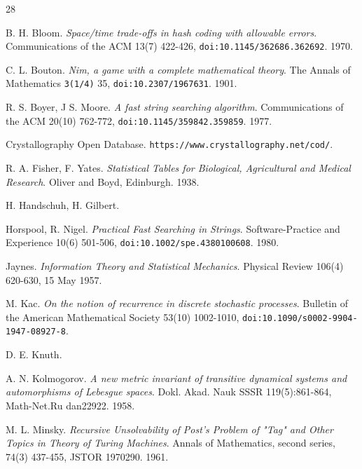 \backmatter
{}
\begin{thebibliography}{28}

B. H. Bloom. \emph{Space/time trade-offs in hash coding with allowable errors}. Communications of the ACM 13(7) 422-426, \texttt{doi:10.1145/\allowbreak{}362686.362692}. 1970.

C. L. Bouton. \emph{Nim, a game with a complete mathematical theory}. The Annals of Mathematics \texttt{3(1/\allowbreak{}4)} 35, \texttt{doi:10.2307/\allowbreak{}1967631}. 1901.

R. S. Boyer, J S. Moore. \emph{A fast string searching algorithm}. Communications of the ACM 20(10) 762-772, \texttt{doi:10.1145/\allowbreak{}359842.359859}. 1977.

Crystallography Open Database. \texttt{https:/\allowbreak{}/\allowbreak{}www.crystallography.net/\allowbreak{}cod/\allowbreak{}}.

R. A. Fisher, F. Yates. \emph{Statistical Tables for Biological, Agricultural and Medical Research}. Oliver and Boyd, Edinburgh. 1938.

H. Handschuh, H. Gilbert.

Horspool, R. Nigel. \emph{Practical Fast Searching in Strings}. Software-Practice and Experience 10(6) 501-506, \texttt{doi:10.1002/\allowbreak{}spe.4380100608}. 1980.

Jaynes. \emph{Information Theory and Statistical Mechanics}. Physical Review 106(4) 620-630, 15 May 1957.

M. Kac. \emph{On the notion of recurrence in discrete stochastic processes}. Bulletin of the American Mathematical Society 53(10) 1002-1010, \texttt{doi:10.1090/\allowbreak{}s0002-9904-1947-08927-8}.

D. E. Knuth.

A. N. Kolmogorov. \emph{A new metric invariant of transitive dynamical systems and automorphisms of Lebesgue spaces}. Dokl. Akad. Nauk SSSR 119(5):861-864, Math-Net.Ru dan22922. 1958.

M. L. Minsky. \emph{Recursive Unsolvability of Post's Problem of "Tag" and Other Topics in Theory of Turing Machines}. Annals of Mathematics, second series, 74(3) 437-455, JSTOR 1970290. 1961.


\end{thebibliography}
